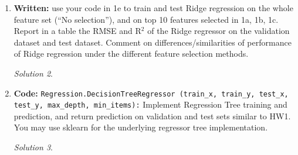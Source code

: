 \documentclass[a4paper,12pt]{article}
\theoremstyle{definition}
\theoremstyle{remark}
\newtheorem*{solution}{Solution}
\begin{document}
\begin{enumerate}
\begin{enumerate}
\begin{solution}
			\end{solution}
			\item {\bf Written:} use your code in 1e to train and test Ridge regression on the whole feature set (“No selection”), and on
			top 10 features selected in 1a, 1b, 1c. Report in a table the RMSE and R$^2$ of the Ridge regressor on the
			validation dataset and test dataset. Comment on differences/similarities of performance of Ridge regression
			under the different feature selection methods.
			\begin{solution}
			
			\end{solution}
			\item {\bf Code:} {\tt Regression.DecisionTreeRegressor (train\_x, train\_y, test\_x, test\_y, max\_depth, min\_items):}
			Implement Regression Tree training and prediction, and return prediction on validation and test sets similar to
			HW1. You may use sklearn for the underlying regressor tree implementation.
			\begin{solution}
			

\end{solution}
\end{enumerate}
\end{enumerate}
\end{document}
